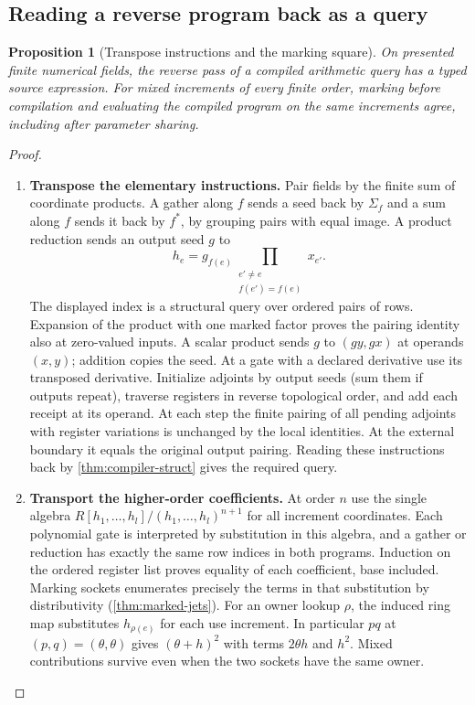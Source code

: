 \documentclass[11pt,a4paper]{article}
\newtheorem{proposition}[proposition]{Proposition}
\theoremstyle{definition}
\theoremstyle{remark}\newaliascnt{remark}{theorem}
\numberwithin{equation}{section}
\begin{document}
\subsection{Reading a reverse program back as a query}
\begin{proposition}[Transpose instructions and the marking square]\label{thm:compiler-reverse}
On presented finite numerical fields, the reverse pass of a compiled arithmetic query has a typed source expression. For mixed increments of every finite order, marking before compilation and evaluating the compiled program on the same increments agree, including after parameter sharing.
\end{proposition}
\begin{proof}\leavevmode
\begin{enumerate}[titledsteps]
    \item \textbf{Transpose the elementary instructions.} Pair fields by the finite sum of coordinate products. A gather along $f$ sends a seed back by $\Sigma_f$ and a sum along $f$ sends it back by $f^*$, by grouping pairs with equal image. A product reduction sends an output seed $g$ to
\[
 h_e=g_{f(e)}
       \prod_{\substack{e'\ne e\\ f(e')=f(e)}}x_{e'} .
\]
The displayed index is a structural query over ordered pairs of rows. Expansion of the product with one marked factor proves the pairing identity also at zero-valued inputs. A scalar product sends $g$ to $(gy,gx)$ at operands $(x,y)$; addition copies the seed. At a gate with a declared derivative use its transposed derivative. Initialize adjoints by output seeds (sum them if outputs repeat), traverse registers in reverse topological order, and add each receipt at its operand. At each step the finite pairing of all pending adjoints with register variations is unchanged by the local identities. At the external boundary it equals the original output pairing. Reading these instructions back by \cref{thm:compiler-struct} gives the required query.


    \item \textbf{Transport the higher-order coefficients.} At order $n$ use the single algebra $R[h_1,\ldots,h_l]/(h_1,\ldots,h_l)^{n+1}$ for all increment coordinates. Each polynomial gate is interpreted by substitution in this algebra, and a gather or reduction has exactly the same row indices in both programs. Induction on the ordered register list proves equality of each coefficient, base included. Marking sockets enumerates precisely the terms in that substitution by distributivity (\cref{thm:marked-jets}). For an owner lookup $\rho$, the induced ring map substitutes $h_{\rho(e)}$ for each use increment. In particular $p q$ at $(p,q)=(\theta,\theta)$ gives $(\theta+h)^2$ with terms $2\theta h$ and $h^2$. Mixed contributions survive even when the two sockets have the same owner.\qedhere
\end{enumerate}
\end{proof}
\end{document}

